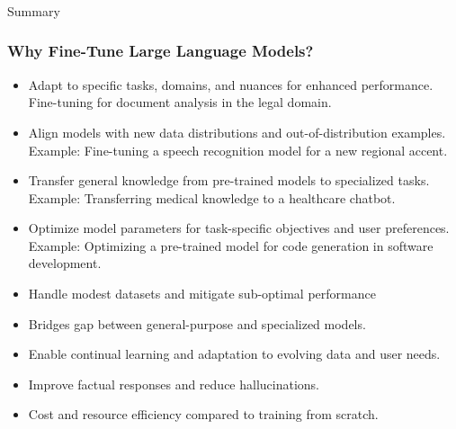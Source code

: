 \begin{frame}[fragile]\frametitle{}
\begin{center}
{\Large Summary}
\end{center}
\end{frame}

\begin{frame}[fragile]\frametitle{Why Fine-Tune Large Language Models?}
  \begin{itemize}
    \item Adapt to specific tasks, domains, and nuances for enhanced performance. Fine-tuning for document analysis in the legal domain.
    \item Align models with new data distributions and out-of-distribution examples. Example: Fine-tuning a speech recognition model for a new regional accent.
    \item Transfer general knowledge from pre-trained models to specialized tasks. Example: Transferring medical knowledge to a healthcare chatbot.
    \item Optimize model parameters for task-specific objectives and user preferences. Example: Optimizing a pre-trained model for code generation in software development.
    \item Handle modest datasets and mitigate sub-optimal performance
    \item Bridges gap between general-purpose and specialized models.
    \item Enable continual learning and adaptation to evolving data and user needs.
    \item Improve factual responses and reduce hallucinations.
    \item Cost and resource efficiency compared to training from scratch.
  \end{itemize}
\end{frame}

